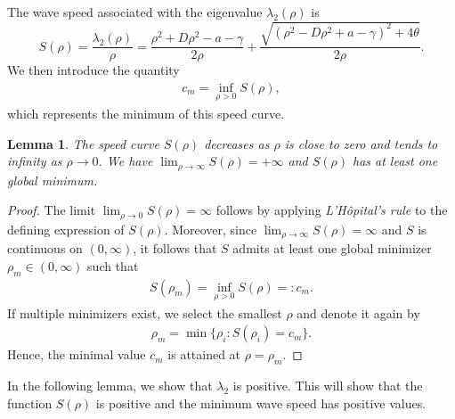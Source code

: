 \documentclass[11pt]{article}
\newtheorem{lemma}[thm]{Lemma}
\theoremstyle{definition}
\begin{document}
The wave speed associated with the eigenvalue $\lambda_{2}(\rho)$ is
\[
    S(\rho) = \frac{\lambda_{2}(\rho)}{\rho}
    = \frac{\rho^2 + D\rho^2 - a - \gamma}{2\rho}
    + \frac{\sqrt{(\rho^2 - D\rho^2 + a - \gamma)^2 + 4\theta}}{2\rho}.
\]
We then introduce the quantity
\begin{align} \label{barc definiton}
    c_m = \inf_{\rho>0} S(\rho),
\end{align}
which represents the minimum of this speed curve. 
    
    \begin{lemma}
        The speed curve $S(\rho)$ decreases as $\rho$ is close to zero and tends to infinity as $\rho \to 0$. We have $\lim_{\rho \to \infty}S(\rho)= +\infty$ and ${S}(\rho)$ has at least one global minimum. 
    \end{lemma} 
  \begin{proof}
      The limit $\displaystyle \lim_{\rho \to 0} S(\rho) = \infty$ follows by applying \textit{L'Hôpital's rule} to the defining expression of $S(\rho)$.
Moreover, since $\displaystyle \lim_{\rho \to \infty} S(\rho) = \infty$ and $S$ is continuous on $(0,\infty)$, it follows that
$S$ admits at least one global minimizer ${\rho}_m \in (0,\infty)$ such that
\begin{align}
    S({\rho}_m) = \inf_{\rho>0} S(\rho) =: {c}_m.
\end{align}
If multiple minimizers exist, we select the smallest $\rho$ and denote it again by
\begin{align}\label{rho_m_definiton}
    {\rho}_m = \min\{\rho_i : S(\rho_i) = {c}_m\}.
\end{align}
Hence, the minimal value ${c}_m$ is attained at $\rho ={\rho}_m$.
 \end{proof}
 In the following lemma, we show that $\lambda_2$ is positive. This will show that the function $S(\rho)$ is positive and the minimum wave speed has positive values.
\end{document}
